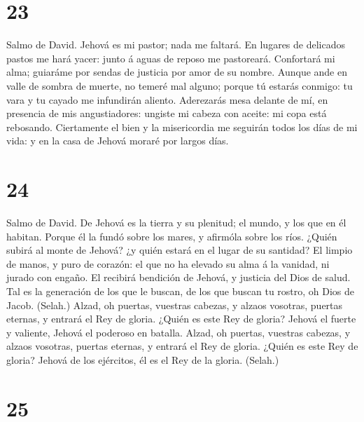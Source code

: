 \hypertarget{section-22}{%
\section{23}\label{section-22}}

 Salmo de David. Jehová es mi pastor; nada me faltará.
 En lugares de delicados pastos me hará yacer: junto á
aguas de reposo me pastoreará.  Confortará mi alma;
guiaráme por sendas de justicia por amor de su nombre. 
Aunque ande en valle de sombra de muerte, no temeré mal alguno; porque
tú estarás conmigo: tu vara y tu cayado me infundirán aliento.
 Aderezarás mesa delante de mí, en presencia de mis
angustiadores: ungiste mi cabeza con aceite: mi copa está rebosando.
 Ciertamente el bien y la misericordia me seguirán todos
los días de mi vida: y en la casa de Jehová moraré por largos días.

\hypertarget{section-23}{%
\section{24}\label{section-23}}

 Salmo de David. De Jehová es la tierra y su plenitud; el
mundo, y los que en él habitan.  Porque él la fundó sobre
los mares, y afirmóla sobre los ríos.  ¿Quién subirá al
monte de Jehová? ¿y quién estará en el lugar de su santidad?
 El limpio de manos, y puro de corazón: el que no ha
elevado su alma á la vanidad, ni jurado con engaño.  El
recibirá bendición de Jehová, y justicia del Dios de salud.
 Tal es la generación de los que le buscan, de los que
buscan tu rostro, oh Dios de Jacob. (Selah.)  Alzad, oh
puertas, vuestras cabezas, y alzaos vosotras, puertas eternas, y entrará
el Rey de gloria.  ¿Quién es este Rey de gloria? Jehová el
fuerte y valiente, Jehová el poderoso en batalla.  Alzad,
oh puertas, vuestras cabezas, y alzaos vosotras, puertas eternas, y
entrará el Rey de gloria.  ¿Quién es este Rey de gloria?
Jehová de los ejércitos, él es el Rey de la gloria. (Selah.)

\hypertarget{section-24}{%
\section{25}\label{section-24}}

